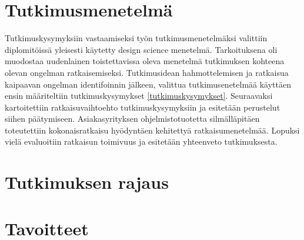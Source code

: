 \section{Tutkimusmenetelmä}

Tutkimuskysymyksiin vastaamiseksi työn tutkimusmenetelmäksi valittiin diplomitöissä yleisesti käytetty design science menetelmä.
Tarkoituksena oli muodostaa uudenlainen toistettavissa oleva menetelmä tutkimuksen kohteena olevan ongelman ratkaisemiseksi.
Tutkimusidean hahmottelemisen ja ratkaisua kaipaavan ongelman identifoinnin jälkeen, valittua tutkimusenetelmää käyttäen ensin määriteltiin tutkimuskysymykset \ref{tutkimuskysymykset}.
Seuraavaksi kartoitettiin ratkaisuvaihtoehto tutkimuskysymyksiin ja esitetään perustelut siihen päätymiseen.
Asiakasyrityksen ohjelmistotuotetta silmälläpitäen toteutettiin kokonaisratkaisu hyödyntäen kehitettyä ratkaisumenetelmää.
Lopuksi vielä evaluoitiin ratkaisun toimivuus ja esitetään yhteenveto tutkimuksesta.


\section{Tutkimuksen rajaus}


\section{Tavoitteet}

